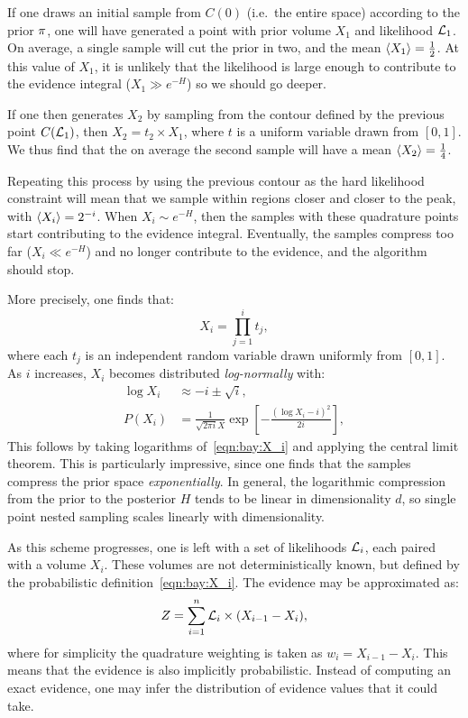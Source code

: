 If one draws an initial sample from \(C(0)\) (i.e.\ the entire space) according to the prior \(\pi\), one will have generated a point with prior volume \(X_1\) and likelihood \(\mathcal{L}_1\). On average, a single sample will cut the prior in two, and the mean \({\left\langle{X_1}\right\rangle}=\frac{1}{2}\). At this value of \(X_1\), it is unlikely that the likelihood is large enough to contribute to the evidence integral (\(X_1\gg e^{-H}\)) so we should go deeper.

If one then generates \(X_2\) by sampling from the contour defined by the previous point \(C(\mathcal{L}_1)\), then \(X_2=t_2\times X_1\), where \(t\) is a uniform variable drawn from \([0,1]\). We thus find that the on average the second sample will have a mean \({\left\langle{X_2}\right\rangle} = \frac{1}{4}\). 

Repeating this process by using the previous contour as the hard likelihood constraint will mean that we sample within regions closer and closer to the peak, with \({\left\langle{X_i}\right\rangle} = 2^{-i}\). When \(X_i\sim e^{-H}\), then the samples with these quadrature points start contributing to the evidence integral. Eventually, the samples compress too far (\(X_i\ll e^{-H}\)) and no longer contribute to the evidence, and the algorithm should stop.

More precisely, one finds that:
\begin{equation}
  X_i = \prod_{j=1}^i t_j,
  \label{eqn:bay:X_i}
\end{equation}
where each \(t_j\) is an independent random variable drawn uniformly from \([0,1]\). As \(i\) increases, \(X_i\) becomes distributed {\em log-normally\/} with:
\begin{align}
  \log X_i  &\approx -i \pm \sqrt{i},
  \label{eqn:bay:log_normal_1_1}
  \\
  P(X_i) &= \frac{1}{\sqrt{2\pi i} X}\exp\left[ -\frac{{\left( \log X_i - i \right)}^2}{2 i}  \right],
  \label{eqn:bay:log_normal_1_2}
\end{align}
This follows by taking logarithms of~\eqref{eqn:bay:X_i} and applying the central limit theorem. This is particularly impressive, since one finds that the samples compress the prior space {\em exponentially}. In general, the logarithmic compression from the prior to the posterior \(H\) tends to be linear in dimensionality \(d\), so single point nested sampling scales linearly with dimensionality.

As this scheme progresses, one is left with a set of likelihoods \(\mathcal{L}_i\), each paired with a volume \(X_i\). These volumes are not deterministically known, but defined by the probabilistic definition~\eqref{eqn:bay:X_i}. The evidence may be approximated as:
\begin{equation}
  Z = \sum_{i=1}^n \mathcal{L}_i \times (X_{i-1}-X_{i}),
  \label{eqn:bay:ev_sum}
\end{equation}
where for simplicity the quadrature weighting is taken as \(w_i = X_{i-1}-X_i\). This means that the evidence is also implicitly probabilistic. Instead of computing an exact evidence, one may infer the distribution of evidence values that it could take.

